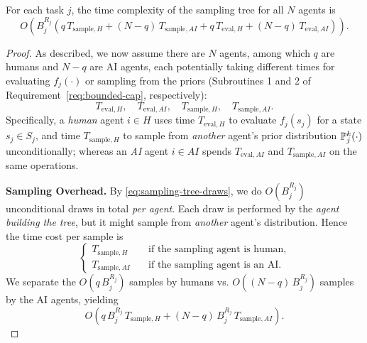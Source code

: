 \begin{lemma}\label{lem:sampling-tree-time}
For each task $j$, the time complexity of the sampling tree for all $N$ agents is
\begin{equation}\label{eq:spanning-tree-time}
O\left(B_j^{R_j}\left(q\,T_{\text{sample},H}
               + (N-q)\,T_{\text{sample},AI}
               + q\,T_{\text{eval},H}
               + (N-q)\,T_{\text{eval},AI}\right)\right).
\end{equation}
\end{lemma}
\begin{proof}
As described, we now assume there are $N$ agents, among which $q$ are humans and $N-q$ are AI agents, each potentially taking different times for evaluating $f_j(\cdot)$ or sampling from the priors (Subroutines 1 and 2 of Requirement~\ref{req:bounded-cap}, respectively):
\begin{equation*}
  T_{\text{eval},H},\quad T_{\text{eval},AI},\quad
  T_{\text{sample},H},\quad T_{\text{sample},AI}.
\end{equation*}
Specifically, a \emph{human} agent $i\in H$ uses time $T_{\text{eval},H}$ to evaluate $f_j(s_j)$ for a state $s_j\in S_j$, and time $T_{\text{sample},H}$ to sample from \emph{another} agent's prior distribution $\mathbb{P}^k_j(\cdot)$ unconditionally; whereas an \emph{AI} agent $i\in AI$ spends $T_{\text{eval},AI}$ and $T_{\text{sample},AI}$ on the same operations.

\textbf{Sampling Overhead.} By \eqref{eq:sampling-tree-draws}, we do $O\left(B_j^{R_j}\right)$ unconditional draws in total \emph{per agent}.
  Each draw is performed by the \emph{agent building the tree}, but it might sample from \emph{another} agent's distribution.
  Hence the time cost per sample is
  \begin{equation*}
    \begin{cases}
      T_{\text{sample},H}\quad &\text{if the sampling agent is human},\\[4pt]
      T_{\text{sample},AI}\quad &\text{if the sampling agent is an AI}.
    \end{cases}
  \end{equation*}
  We separate the $O\left(q\,B_j^{R_j}\right)$ samples by humans vs. $O\left((N-q)\,B_j^{R_j}\right)$ samples by the AI agents, yielding
  \begin{equation*}
  O\left(q\,B_j^{R_j}\,T_{\text{sample},H} + (N-q)\,B_j^{R_j}\,T_{\text{sample},AI}\right).
  \end{equation*}


\end{proof}

